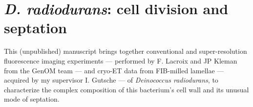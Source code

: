\chapter{\textit{D. radiodurans}: cell division and septation}\label{drad}

This (unpublished) manuscript brings together conventional and super-resolution fluorescence imaging experiments --- performed by F. Lacroix and JP Kleman from the GenOM team --- and cryo-ET data from FIB-milled lamellae --- acquired by my supervisor I. Gutsche --- of \textit{Deinococcus radiodurans}, to characterize the complex composition of this bacterium's cell wall and its unusual mode of septation.

\localtableofcontents
\newpage

\newpage

